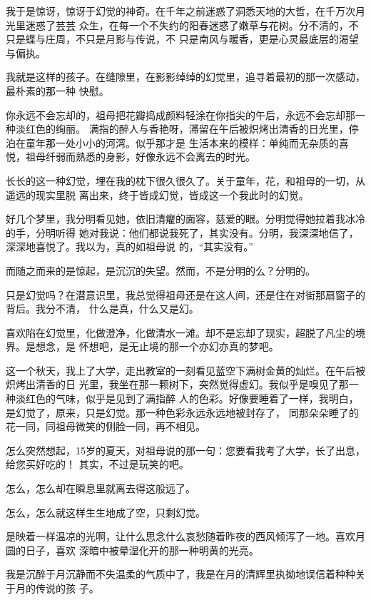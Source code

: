 		我于是惊讶，惊讶于幻觉的神奇。在千年之前迷惑了洞悉天地的大哲，在千万次月光里迷惑了芸芸
	众生，在每一个不失约的阳春迷惑了嫩草与花树。分不清的，不只是蝶与庄周，不只是月影与传说，不
	只是南风与暖香，更是心灵最底层的渴望与偏执。

		我就是这样的孩子。在缝隙里，在影影绰绰的幻觉里，追寻着最初的那一次感动，最朴素的那一种
	快慰。

		你永远不会忘却的，祖母把花瓣捣成颜料轻涂在你指尖的午后，永远不会忘却那一种淡红色的绚丽。
	满指的醉人与香艳呀，滞留在午后被炽烤出清香的日光里，停泊在童年那一处小小的河湾。似乎那才是
	生活本来的模样：单纯而无杂质的喜悦，祖母纤弱而熟悉的身影，好像永远不会离去的时光。

		长长的这一种幻觉，埋在我的枕下很久很久了。关于童年，花，和祖母的一切，从遥远的现实里脱
	离出来，终于皆成幻觉，皆成这一个我此时的幻觉。

		好几个梦里，我分明看见她，依旧清癯的面容，慈爱的眼。分明觉得她拉着我冰冷的手，分明听得
	她对我说：他们都说我死了，其实没有。分明，我深深地信了，深深地喜悦了。我以为，真的如祖母说
	的，“其实没有。”

		而随之而来的是惊起，是沉沉的失望。然而，不是分明的么？分明的。

		只是幻觉吗？在潜意识里，我总觉得祖母还是在这人间，还是住在对街那扇窗子的背后。我分不清，
	什么是真，什么又是幻。

		喜欢陷在幻觉里，化做澄净，化做清水一滩。却不是忘却了现实，超脱了凡尘的境界。是想念，是
	怀想吧，是无止境的那一个亦幻亦真的梦吧。

		这一个秋天，我上了大学，走出教室的一刻看见蓝空下满树金黄的灿烂。在午后被炽烤出清香的日
	光里，我坐在那一颗树下，突然觉得虚幻。我似乎是嗅见了那一种淡红色的气味，似乎是见到了满指醉
	人的色彩。好像要睡着了一样，我明白，是幻觉了，原来，只是幻觉。那一种色彩永远永远地被封存了，
	同那朵朵睡了的花一同，同祖母微笑的侧脸一同，再不相见。

		怎么突然想起，15岁的夏天，对祖母说的那一句：您要看我考了大学，长了出息，给您买好吃的！
	其实，不过是玩笑的吧。

		怎么，怎么却在瞬息里就离去得这般远了。

		怎么，怎么就这样生生地成了空，只剩幻觉。

	\endwriting



		是映着一样温凉的光啊，让什么思念什么哀愁随着昨夜的西风倾泻了一地。喜欢月圆的日子，喜欢
	深暗中被晕湿化开的那一种明黄的光亮。

		我是沉醉于月沉静而不失温柔的气质中了，我是在月的清辉里执拗地误信着种种关于月的传说的孩
	子。

